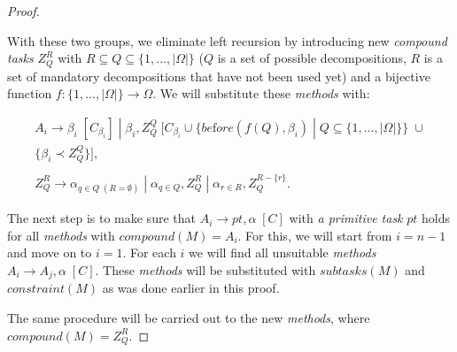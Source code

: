 \begin{proof}
\begin{enumerate}
        With these two groups, we eliminate left recursion by introducing new \emph{compound tasks} $Z_Q^R$ with $R \subseteq Q \subseteq \{1, \dots, |\Omega|\}$ ($Q$ is a set of possible decompositions, $R$ is a set of mandatory decompositions that have not been used yet) and a bijective function $f: \{1, \dots, |\Omega|\} \rightarrow \Omega$. We will substitute these \emph{methods} with:

        \begin{gather*}
            A_i \rightarrow \beta_i \; [C_{\beta_i}] \; | \; \beta_i, Z_Q^Q \; [C_{\beta_i} \cup \{be\text{f}ore(f(Q), \beta_i) \; | \; Q \subseteq \{1, \dots, |\Omega|\}\} \; \cup \\ \{\beta_i \prec Z_Q^Q\}], \\ \\
            Z_Q^R \rightarrow \alpha_{q \in Q \; (R = \emptyset)} \; | \; \alpha_{q \in Q}, Z_Q^R \; | \; \alpha_{r \in R}, Z_Q^{R - \{r\}}.
        \end{gather*}
    \end{enumerate}
    
    The next step is to make sure that $A_i \rightarrow pt, \alpha \; [C]$ with \emph{a primitive task} $pt$ holds for all \emph{methods} with $compound(M) = A_i$. For this, we will start from $i = n - 1$ and move on to $i = 1$. For each $i$ we will find all unsuitable \emph{methods} $A_i \rightarrow A_j, \alpha \; [C]$. These \emph{methods} will be substituted with $subtasks(M)$ and $constraint(M)$ as was done earlier in this proof.

    The same procedure will be carried out to the new \emph{methods}, where \\ $compound(M) = Z_Q^{R}$.
\end{proof}




